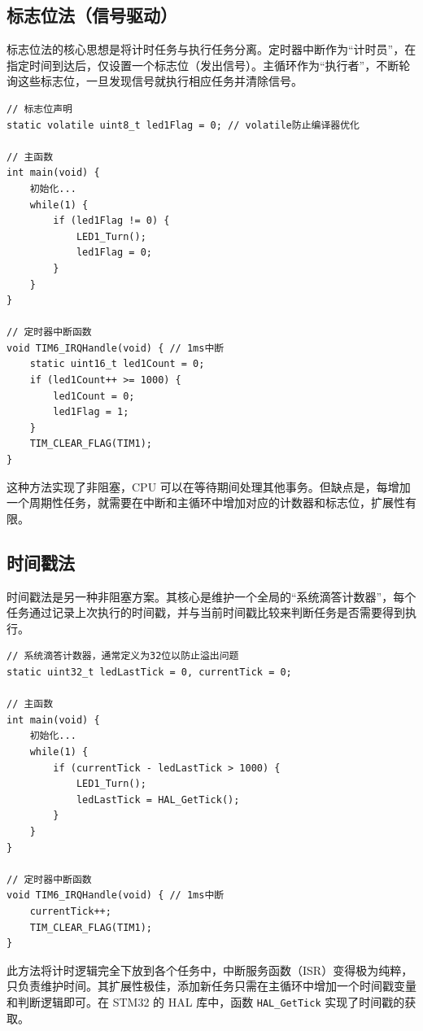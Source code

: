 \subsection{标志位法（信号驱动）}

标志位法的核心思想是将计时任务与执行任务分离。定时器中断作为“计时员”，在指定时间到达后，仅设置一个标志位（发出信号）。主循环作为“执行者”，不断轮询这些标志位，一旦发现信号就执行相应任务并清除信号。

\begin{lstlisting}[style=c]
// 标志位声明
static volatile uint8_t led1Flag = 0; // volatile防止编译器优化

// 主函数
int main(void) {
    初始化...
    while(1) {
        if (led1Flag != 0) {
            LED1_Turn();
            led1Flag = 0;
        }
    }
}

// 定时器中断函数
void TIM6_IRQHandle(void) { // 1ms中断
    static uint16_t led1Count = 0;
    if (led1Count++ >= 1000) {
        led1Count = 0;
        led1Flag = 1;
    }
    TIM_CLEAR_FLAG(TIM1);
}
\end{lstlisting}

这种方法实现了非阻塞，CPU 可以在等待期间处理其他事务。但缺点是，每增加一个周期性任务，就需要在中断和主循环中增加对应的计数器和标志位，扩展性有限。

\subsection{时间戳法}

时间戳法是另一种非阻塞方案。其核心是维护一个全局的“系统滴答计数器”，每个任务通过记录上次执行的时间戳，并与当前时间戳比较来判断任务是否需要得到执行。

\begin{lstlisting}[style=c]
// 系统滴答计数器，通常定义为32位以防止溢出问题
static uint32_t ledLastTick = 0, currentTick = 0;

// 主函数
int main(void) {
    初始化...
    while(1) {
        if (currentTick - ledLastTick > 1000) {
            LED1_Turn();
            ledLastTick = HAL_GetTick();
        }
    }
}

// 定时器中断函数
void TIM6_IRQHandle(void) { // 1ms中断
    currentTick++;
    TIM_CLEAR_FLAG(TIM1);
}
\end{lstlisting}

此方法将计时逻辑完全下放到各个任务中，中断服务函数（ISR）变得极为纯粹，只负责维护时间。其扩展性极佳，添加新任务只需在主循环中增加一个时间戳变量和判断逻辑即可。在 STM32 的 HAL 库中，函数 \texttt{HAL\_GetTick} 实现了时间戳的获取。

